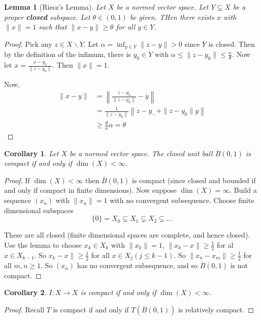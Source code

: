 \documentclass[10pt, oneside, reqno]{amsbook}
\theoremstyle{plain}%
\newtheorem{lem}[thm]{Lemma}
\newtheorem*{cor}{Corollary}
\theoremstyle{definition}
\theoremstyle{remark}
\begin{document}
\begin{lem}[Riesz's Lemma]
    Let $X$ be a normed vector space.  Let $Y \subsetneq X$ be a proper \textbf{closed} subspace.  Let $\theta \in (0, 1)$ be given. THen there exists $x$ with $\| x \| = 1$ such that $\| x - y \| \geq \theta$ for all $y \in Y$.  
\end{lem}
\begin{proof}
    Pick any $z \in X \backslash Y$.  Let $\alpha = \inf_{y \in Y} \| z - y \| > 0$ since $Y$ is closed.  Then by the definition of the infimum, there is $y_0 \in Y$ with $\alpha \leq \| z - y_0 \| \leq \frac{\alpha}{\theta}$.  Now let $x = \frac{x - y_0}{\| z - y_0 \|}$.  Then $\| x \| = 1$.  
    
    Now, \begin{align*}
        \| x - y \| &= \left \| \frac{z - y_0}{\| z - y_0 \|} - y \right \| \\
                    &= \frac{1}{\| z - y_0 \|} \left \| z - y_- + \| z - y_0 \| y \right \| \\
                    &\geq \frac{\theta}{\alpha} \alpha = \theta
    \end{align*}
\end{proof}

\begin{cor}
    Let $X$ be a normed vector space.  The closed unit ball $\overline B(0, 1)$ is compact if and only if $\dim(X) < \infty$.  
\end{cor}
\begin{proof}
    If $\dim(X) < \infty$ then $\overline B(0, 1)$ is compact (since closed and bounded if and only if compact in finite dimensions).  Now suppose $\dim(X) = \infty$.  Build a sequence $(x_n)$ with $\| x_n \| = 1$ with no convergent subsequence.  Choose finite dimensional subspaces \[
        \{ 0 \} = X_0 \subsetneq X_1 \subsetneq X_2 \subsetneq \dots
    \]  
    
    These are all closed (finite dimensional spaces are complete, and hence closed).  Use the lemma to choose $x_k \in X_k$ with $\| x_k \| = 1$, $\| x_k - x \| \geq \frac{1}{2}$ for al $ x \in X_{k-1}$.  So $x_k - x \| \geq \frac{1}{2}$ for all $x \in X_j (j \leq k - 1)$.  So $\| x_n - x_m \| \geq \frac{1}{2}$ for all $m , n \geq 1$.  So $(x_n)$ has no convergent subsequence, and so $\overline B(0, 1)$ is not compact.  
\end{proof}
\begin{cor}
    $I : X \rightarrow X$ is compact if and only if $\dim(X) < \infty$.  
\end{cor}
\begin{proof}
    Recall $T$ is compact if and only if $T(\overline B(0, 1))$ is relatively compact.  
\end{proof}
\end{document}
